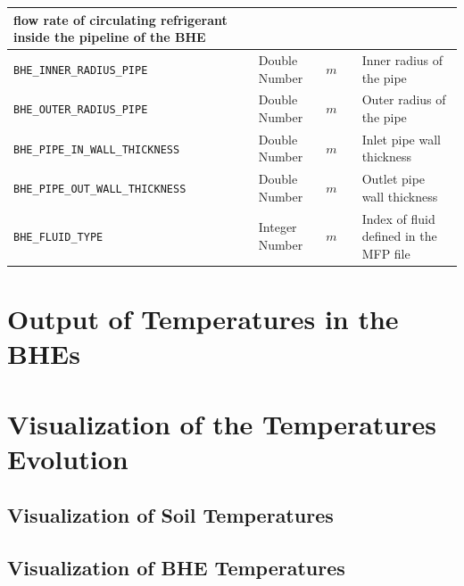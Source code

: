 \begin{table}
\begin{tabular}{C{2.5cm} C{3cm} C{1.5cm} C{3cm} L{5cm} }
flow rate of circulating refrigerant inside the pipeline of the BHE  \\
\hline
{\tiny
\texttt{BHE\_INNER\_RADIUS\_PIPE} 
}
& 
{\small
Double Number
}
& $m$  & &  
Inner radius of the pipe  \\
\hline
{\tiny
\texttt{BHE\_OUTER\_RADIUS\_PIPE} 
}
& 
{\small
Double Number
}
& $m$  & &  
Outer radius of the pipe  \\
\hline
{\tiny
\texttt{BHE\_PIPE\_IN\_WALL\_THICKNESS} 
}
& 
{\small
Double Number
}
& $m$  & &  
Inlet pipe wall thickness  \\
\hline
{\tiny
\texttt{BHE\_PIPE\_OUT\_WALL\_THICKNESS} 
}
& 
{\small
Double Number
}
& $m$  & &  
Outlet pipe wall thickness  \\
\hline
{\small
\texttt{BHE\_FLUID\_TYPE} 
}
& 
{\small
Integer Number
}
& $m$  & &  
Index of fluid defined in the MFP file  \\
\hline
\end{tabular}
\end{table}

\section{Output of Temperatures in the BHEs}
\label{sec:temp_output}


\section{Visualization of the Temperatures Evolution}

\subsection{Visualization of Soil Temperatures}

\subsection{Visualization of BHE Temperatures}


